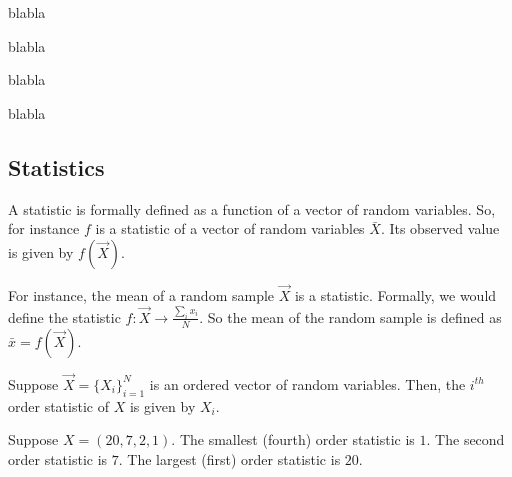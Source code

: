 \begin{definition}[Independence]
blabla
\end{definition}

\begin{definition}[i.i.d]
blabla
\end{definition}

\begin{definition}
blabla
\end{definition}

\begin{definition}
blabla
\end{definition}

\subsection{Statistics}

\begin{definition}[Statistic]
A statistic is formally defined as a function of a vector of random variables. So, for instance $f$ is a statistic of a vector of random variables $\bar{X}$. Its observed value is given by $f(\vec{X})$.
\end{definition}

\begin{example}
For instance, the mean of a random sample $\vec{X}$ is a statistic. Formally, we would define the statistic $f : \vec{X} \to \frac{\sum_i x_i}{N}$. So the mean of the random sample is defined as $\bar{x} = f(\vec{X})$.
\end{example}


\begin{definition}
Suppose $\vec{X} = \{X_i\}_{i = 1}^N$ is an ordered vector of random variables. Then, the $i^{th}$ order statistic of $X$ is given by $X_i$.
\end{definition}

\begin{example}
Suppose $X = (20,7,2,1)$. The smallest (fourth) order statistic is $1$. The second order statistic is $7$. The largest (first) order statistic is $20$.
\end{example}


